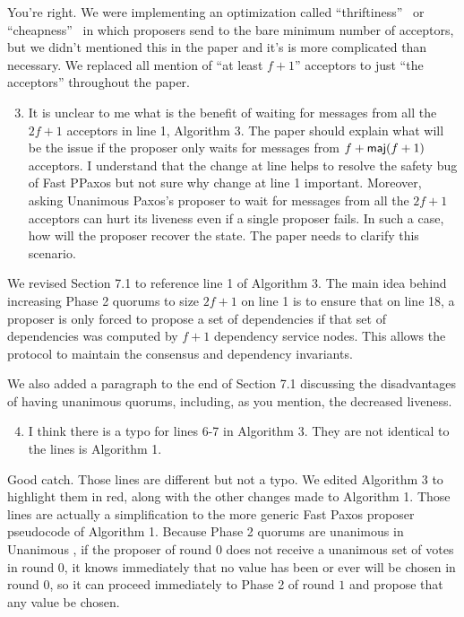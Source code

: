 \documentclass[letterpaper,twocolumn,10pt]{article}
\newenvironment{reviewerquote}
{\list{}{\leftmargin=\parindent\rightmargin=0in}\item[] \itshape \color{ReviewerDarkGray}}%
{\endlist}
\begin{document}
You're right. We were implementing an optimization called
``thriftiness''~\cite{moraru2013there} or ``cheapness''~\cite{lamport2004cheap}
in which proposers send to the bare minimum number of acceptors, but we didn't
mentioned this in the paper and it's is more complicated than necessary. We
replaced all mention of ``at least $f+1$'' acceptors to just ``the acceptors''
throughout the paper.

\begin{reviewerquote}
  \begin{enumerate}
    \setcounter{enumi}{2}
    \item
      It is unclear to me what is the benefit of waiting for messages from all
      the $2f+1$ acceptors in line 1, Algorithm 3. The paper should explain what
      will be the issue if the proposer only waits for messages from $f +
      \textsf{maj}(f+1)$ acceptors. I understand that the change at line helps to resolve
      the safety bug of Fast PPaxos but not sure why change at line 1
      important. Moreover, asking Unanimous Paxos's proposer to wait for
      messages from all the $2f+1$ acceptors can hurt its liveness even if a
      single proposer fails. In such a case, how will the proposer recover the
      state. The paper needs to clarify this scenario.
  \end{enumerate}
\end{reviewerquote}

We revised Section 7.1 to reference line 1 of Algorithm 3. The main idea behind
increasing Phase 2 quorums to size $2f+1$ on line 1 is to ensure that on line
18, a proposer is only forced to propose a set of dependencies if that set of
dependencies was computed by $f+1$ dependency service nodes. This allows the
protocol to maintain the consensus and dependency invariants.

We also added a paragraph to the end of Section 7.1 discussing the
disadvantages of having unanimous quorums, including, as you mention, the
decreased liveness.

\begin{reviewerquote}
  \begin{enumerate}
    \setcounter{enumi}{3}
    \item
      I think there is a typo for lines 6-7 in Algorithm 3. They are not
      identical to the lines is Algorithm 1.
  \end{enumerate}
\end{reviewerquote}

Good catch. Those lines are different but not a typo. We edited Algorithm 3 to
highlight them in red, along with the other changes made to Algorithm 1. Those
lines are actually a simplification to the more generic Fast Paxos proposer
pseudocode of Algorithm 1. Because Phase 2 quorums are unanimous in Unanimous
\BPaxos{}, if the proposer of round $0$ does not receive a unanimous set of
votes in round $0$, it knows immediately that no value has been or ever will be
chosen in round $0$, so it can proceed immediately to Phase 2 of round $1$ and
propose that any value be chosen.
\end{document}
